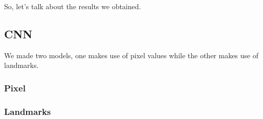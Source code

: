 \documentclass[../paper.tex]{subfiles}
\begin{document}
    So, let's talk about the results we obtained.\\
    \subsection{CNN}
    We made two models, one makes use of pixel values while the other makes use of landmarks.
    \subsubsection{Pixel}
    \subsubsection{Landmarks}
\end{document}
